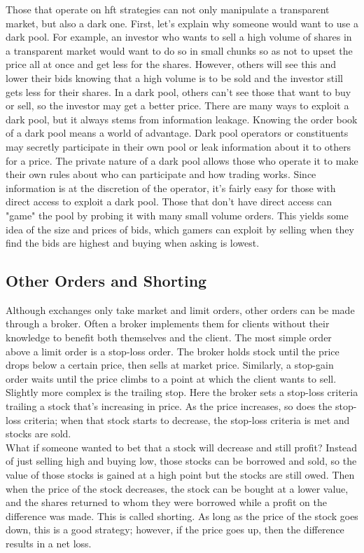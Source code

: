 Those that operate on \ac{hft} strategies can not only manipulate a transparent market, but also a dark one. First, let's explain why someone would want to use a dark pool. For example, an investor who wants to sell a high volume of shares in a transparent market would want to do so in small chunks so as not to upset the price all at once and get less for the shares. However, others will see this and lower their bids knowing that a high volume is to be sold and the investor still gets less for their shares. In a dark pool, others can't see those that want to buy or sell, so the investor may get a better price. There are many ways to exploit a dark pool, but it always stems from information leakage. Knowing the order book of a dark pool means a world of advantage. Dark pool operators or constituents may secretly participate in their own pool or leak information about it to others for a price. The private nature of a dark pool allows those who operate it to make their own rules about who can participate and how trading works. Since information is at the discretion of the operator, it's fairly easy for those with direct access to exploit a dark pool. Those that don't have direct access can "game" the pool by probing it with many small volume orders. This yields some idea of the size and prices of bids, which gamers can exploit by selling when they find the bids are highest and buying when asking is lowest.

\subsection{Other Orders and Shorting}
Although exchanges only take market and limit orders, other orders can be made through a broker. Often a broker implements them for clients without their knowledge to benefit both themselves and the client. The most simple order above a limit order is a stop-loss order. The broker holds stock until the price drops below a certain price, then sells at market price. Similarly, a stop-gain order waits until the price climbs to a point at which the client wants to sell. Slightly more complex is the trailing stop. Here the broker sets a stop-loss criteria trailing a stock that's increasing in price. As the price increases, so does the stop-loss criteria; when that stock starts to decrease, the stop-loss criteria is met and stocks are sold. \\

What if someone wanted to bet that a stock will decrease and still profit? Instead of just selling high and buying low, those stocks can be borrowed and sold, so the value of those stocks is gained at a high point but the stocks are still owed. Then when the price of the stock decreases, the stock can be bought at a lower value, and the shares returned to whom they were borrowed while a profit on the difference was made. This is called shorting. As long as the price of the stock goes down, this is a good strategy; however, if the price goes up, then the difference results in a net loss. \\

